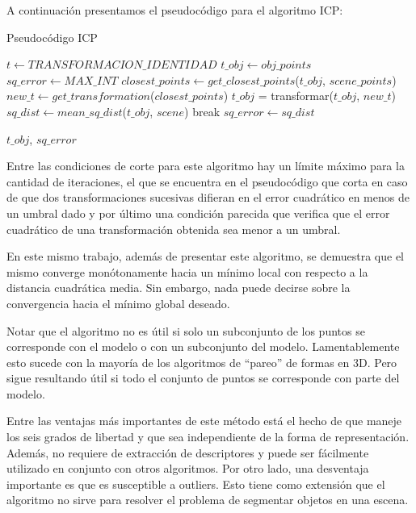 A continuación presentamos el pseudocódigo para el algoritmo ICP:

% 

\begin{algorithm}
\caption{Pseudocódigo ICP}
\label{lst:icp}
\begin{algorithmic}
	\State $t \gets TRANSFORMACION\_IDENTIDAD$
	\State $t\_obj \gets obj\_points$
	\State $sq\_error \gets MAX\_INT$
		\State $closest\_points \gets get\_closest\_points$($t\_obj$, $scene\_points$)
		\State $new\_t \gets get\_transformation$($closest\_points$) 
		\State $t\_obj$ = transformar($t\_obj$, $new\_t$)
		\State $sq\_dist \gets mean\_sq\_dist$($t\_obj$, $scene$)
			\State break 
		\EndIf
		\State $sq\_error \gets sq\_dist$
	\EndWhile

    \State \Return $t\_obj$, $sq\_error$
\EndFunction
\end{algorithmic}
\end{algorithm}

Entre las condiciones de corte para este algoritmo hay un límite máximo para la cantidad de iteraciones, el que se encuentra en el pseudocódigo que corta en caso de que dos transformaciones sucesivas difieran en el error cuadrático en menos de un umbral dado y por último una condición parecida que verifica que el error cuadrático de una transformación obtenida sea menor a un umbral.


En este mismo trabajo, además de presentar este algoritmo, se demuestra que el mismo converge monótonamente hacia un mínimo local con respecto a la distancia cuadrática media. Sin embargo, nada puede decirse sobre la convergencia hacia el mínimo global deseado.

Notar que el algoritmo no es útil si solo un subconjunto de los puntos se corresponde con el modelo o con un subconjunto del modelo. Lamentablemente esto sucede con la mayoría de los algoritmos de ``pareo'' de formas en 3D. Pero sigue resultando útil si todo el conjunto de puntos se corresponde con parte del modelo.

Entre las ventajas más importantes de este método está el hecho de que maneje los seis grados de libertad y que sea independiente de la forma de representación. Además, no requiere de extracción de descriptores y puede ser fácilmente utilizado en conjunto con otros algoritmos. Por otro lado, una desventaja importante es que es susceptible a outliers. Esto tiene como extensión que el algoritmo no sirve para resolver el problema de segmentar objetos en una escena.


